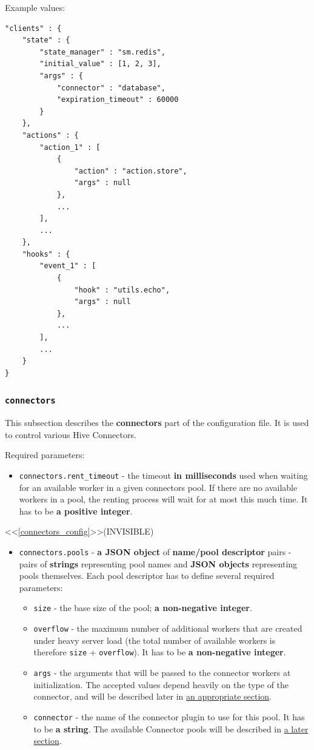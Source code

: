 \documentclass[a4paper]{article}
\begin{document}
\noindent
Example values:


\begin{verbatim}
"clients" : {
    "state" : {
        "state_manager" : "sm.redis",
        "initial_value" : [1, 2, 3],
        "args" : {
            "connector" : "database",
            "expiration_timeout" : 60000
        }
    },
    "actions" : {
        "action_1" : [
            {
                "action" : "action.store",
                "args" : null
            },
            ...
        ],
        ...
    },
    "hooks" : {
        "event_1" : [
            {
                "hook" : "utils.echo",
                "args" : null
            },
            ...
        ],
        ...
    }
}
\end{verbatim}
\subsubsection{\texttt{connectors}}
\label{sec-3-1-4}

This subsection describes the \textbf{connectors} part of the configuration file. It is used to control various Hive Connectors.

\noindent
Required parameters:

\begin{itemize}
\item \texttt{connectors.rent\_timeout} - the timeout \textbf{in milliseconds} used when waiting for an available worker in a given connectors pool. If there are no available workers in a pool, the renting process will wait for at most this much time. It has to be \textbf{a positive integer}.
\end{itemize}

<<\ref{connectors_config}>>(INVISIBLE)

\begin{itemize}
\item \texttt{connectors.pools} - \textbf{a JSON object} of \textbf{name/pool descriptor} pairs - pairs of \textbf{strings} representing pool names and \textbf{JSON objects} representing pools themselves. Each pool descriptor has to define several required parameters:
\begin{itemize}
\item \texttt{size} - the base size of the pool; \textbf{a non-negative integer}.
\item \texttt{overflow} - the maximum number of additional workers that are created under heavy server load (the total number of available workers is therefore \texttt{size} + \texttt{overflow}). It has to be \textbf{a non-negative integer}.
\item \texttt{args} - the arguments that will be passed to the connector workers at initialization. The accepted values depend heavily on the type of the connector, and will be described later in \hyperref[sec-8-4]{an appropriate section}.
\item \texttt{connector} - the name of the connector plugin to use for this pool. It has to be \textbf{a string}. The available Connector pools will be described in \hyperref[sec-8-4]{a later section}.
\end{itemize}
\end{itemize}
\end{document}
